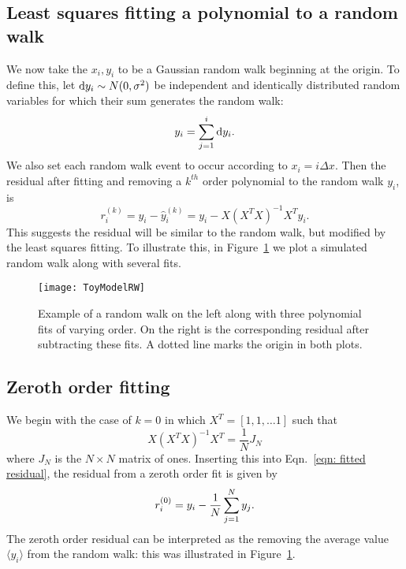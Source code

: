 \documentclass[../full_thesis/full_thesis.tex]{subfiles}
\begin{document}
\begin{subappendices}
\subsection{Least squares fitting a polynomial to a random walk} We now take
the $x_i, y_i$ to be a Gaussian random walk beginning at the origin. To define
this, let $\mathrm{d} y_{i} \sim N(0, \sigma^{2})$ be independent and identically
distributed random variables for which their sum generates the random walk:
\begin{equation}
y_{i} = \sum_{j=1}^{i}\mathrm{d} y_{i}.
\label{eqn: ToyModel RW definition}
\end{equation}
We also set each random walk event to occur according to $x_{i} = i \Delta x$.
Then the residual after fitting and removing a $k^{th}$ order polynomial to the
random walk $y_i$, is
\begin{equation}
r_i^{(k)} = y_{i} - \hat{y}_{i}^{(k)} = y_{i} - X \left(X^{T}X\right)^{-1} X^{T} y_{i}.
\label{eqn: fitted residual}
\end{equation}
This suggests the residual will be similar to the random walk, but modified by
the least squares fitting.  To illustrate this, in Figure~\ref{fig: ToyModelRW}
we plot a simulated random walk along with several fits.
\begin{figure}[htb]
\centering
\texttt{[image: ToyModelRW]}
\caption{Example of a random walk on the left along with three polynomial fits
of varying order. On the right is the corresponding residual after subtracting
these fits. A dotted line marks the origin in both plots.}
\label{fig: ToyModelRW}
\end{figure}

\subsection{Zeroth order fitting}

We begin with the case of $k=0$ in which $X^{T} = [1, 1, \dots 1]$ such
that
\begin{equation}
X \left(X^{T}X\right)^{-1} X^{T} = \frac{1}{N} J_{N}
\end{equation}
where $J_{N}$ is the $N\times N$ matrix of ones.  Inserting this into
Eqn.~\eqref{eqn: fitted residual}, the residual from a zeroth order fit is
given by
\begin{equation}
r_i^{(0)}= y_{i} - \frac{1}{N} \sum_{j=1}^{N}y_{j}.
\end{equation}
The zeroth order residual can be interpreted as the removing the
average value $\langle y_i \rangle$ from the random walk: this was illustrated
in Figure~\ref{fig: ToyModelRW}.


\end{subappendices}
\end{document}
